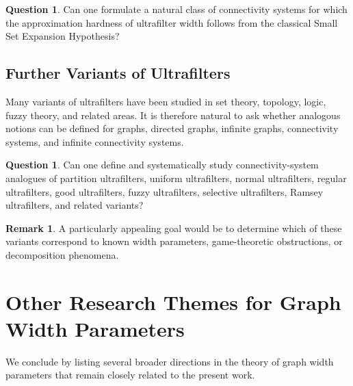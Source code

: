 \documentclass[10pt]{book}
\theoremstyle{definition}
\newtheorem{remark}[theorem]{Remark}
\newtheorem{question}[theorem]{Question}
\begin{document}
\begin{question}
Can one formulate a natural class of connectivity systems for which the approximation hardness of ultrafilter width follows from the classical Small Set Expansion Hypothesis?
\end{question}

\subsection{Further Variants of Ultrafilters}

Many variants of ultrafilters have been studied in set theory, topology, logic, fuzzy theory, and related areas.
It is therefore natural to ask whether analogous notions can be defined for graphs, directed graphs, infinite graphs, connectivity systems, and infinite connectivity systems.

\begin{question}
Can one define and systematically study connectivity-system analogues of partition ultrafilters, uniform ultrafilters, normal ultrafilters, regular ultrafilters, good ultrafilters, fuzzy ultrafilters, selective ultrafilters, Ramsey ultrafilters, and related variants?
\end{question}

\begin{remark}
A particularly appealing goal would be to determine which of these variants correspond to known width parameters, game-theoretic obstructions, or decomposition phenomena.
\end{remark}

\section{Other Research Themes for Graph Width Parameters}

We conclude by listing several broader directions in the theory of graph width parameters that remain closely related to the present work.
\end{document}
